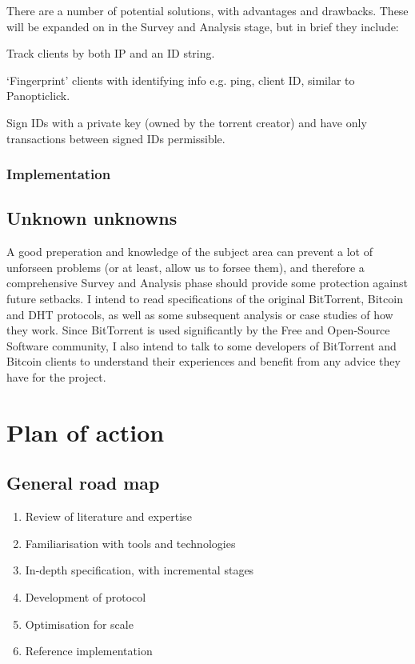 \documentclass{article}
\begin{document}
There are a number of potential solutions, with advantages and drawbacks.  These will be expanded on in the Survey and Analysis stage, but in brief they include:
\begin{itemize*}
\item Track clients by both IP and an ID string.
\item `Fingerprint' clients with identifying info e.g. ping, client ID, similar to Panopticlick.
\item Sign IDs with a private key (owned by the torrent creator) and have only transactions between signed IDs permissible.
\end{itemize*}

\subsubsection{Implementation}

\subsection{Unknown unknowns}
A good preperation and knowledge of the subject area can prevent a lot of unforseen problems (or at least, allow us to forsee them), and therefore a comprehensive Survey and Analysis phase should provide some protection against future setbacks.  I intend to read specifications of the original BitTorrent, Bitcoin and DHT protocols, as well as some subsequent analysis or case studies of how they work.  Since BitTorrent is used significantly by the Free and Open-Source Software community, I also intend to talk to some developers of BitTorrent and Bitcoin clients to understand their experiences and benefit from any advice they have for the project.

\section{Plan of action}
\subsection{General road map}
\begin{enumerate}
\item Review of literature and expertise
\item Familiarisation with tools and technologies
\item In-depth specification, with incremental stages
\item Development of protocol
\item Optimisation for scale
\item Reference implementation
\end{enumerate}
\end{document}
